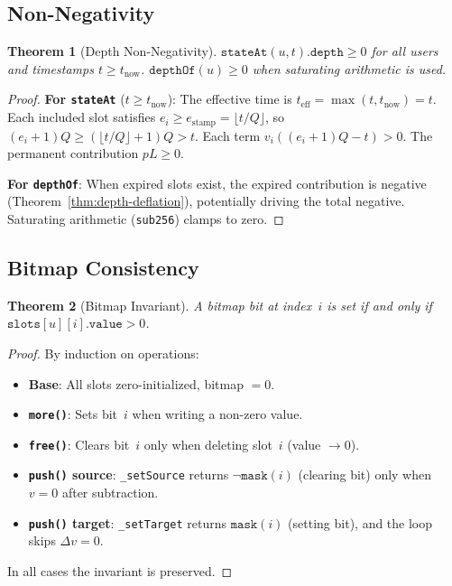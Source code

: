 \documentclass[10pt,a4paper,twocolumn]{article}
\theoremstyle{definition}
\theoremstyle{plain}
\newtheorem{theorem}{Theorem}[section]
\theoremstyle{remark}
\begin{document}
\subsection{Non-Negativity}

\begin{theorem}[Depth Non-Negativity]
\label{thm:non-negativity}
$\texttt{stateAt}(u, t).\texttt{depth} \geq 0$ for all users and timestamps $t \geq t_{\text{now}}$. $\texttt{depthOf}(u) \geq 0$ when saturating arithmetic is used.
\end{theorem}

\begin{proof}
\textbf{For \texttt{stateAt}} ($t \geq t_{\text{now}}$): The effective time is $t_{\text{eff}} = \max(t, t_{\text{now}}) = t$. Each included slot satisfies $e_i \geq e_{\text{stamp}} = \lfloor t/Q \rfloor$, so $(e_i{+}1)Q \geq (\lfloor t/Q \rfloor {+} 1)Q > t$. Each term $v_i((e_i{+}1)Q - t) > 0$. The permanent contribution $pL \geq 0$.

\textbf{For \texttt{depthOf}}: When expired slots exist, the expired contribution is negative (Theorem~\ref{thm:depth-deflation}), potentially driving the total negative. Saturating arithmetic (\texttt{sub256}) clamps to zero.
\end{proof}

\subsection{Bitmap Consistency}

\begin{theorem}[Bitmap Invariant]
\label{thm:bitmap}
A bitmap bit at index~$i$ is set if and only if $\texttt{slots}[u][i].\texttt{value} > 0$.
\end{theorem}

\begin{proof}
By induction on operations:
\begin{itemize}[nosep]
\item \textbf{Base}: All slots zero-initialized, bitmap $= 0$.
\item \textbf{\texttt{more()}}: Sets bit~$i$ when writing a non-zero value.
\item \textbf{\texttt{free()}}: Clears bit~$i$ only when deleting slot~$i$ (value $\to 0$).
\item \textbf{\texttt{push()} source}: \texttt{\_setSource} returns $\lnot\texttt{mask}(i)$ (clearing bit) only when $v = 0$ after subtraction.
\item \textbf{\texttt{push()} target}: \texttt{\_setTarget} returns $\texttt{mask}(i)$ (setting bit), and the loop skips $\Delta v = 0$.
\end{itemize}
In all cases the invariant is preserved.
\end{proof}
\end{document}
